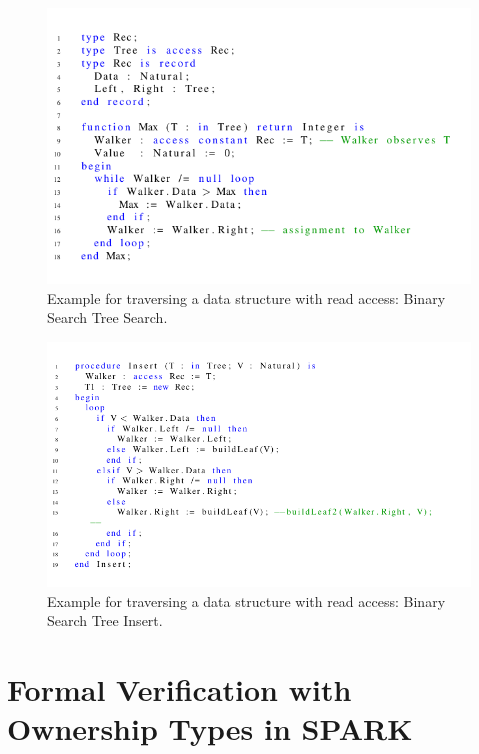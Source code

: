 \documentclass{llncs}
\begin{document}
\begin{figure}[htb!]
\centering
  \captionsetup{justification=centering,margin=0.6cm}
   \includegraphics[width=1\columnwidth]{maxTree}
   \caption{Example for traversing a data structure with read access: Binary Search Tree Search.}
   \label{fig:maxTree}
\end{figure}



\begin{figure}[htb!]
\centering
  \captionsetup{justification=centering,margin=0.6cm}
   \includegraphics[width=1\columnwidth]{treeInsert}
   \caption{Example for traversing a data structure with read access: Binary Search Tree Insert.}
   \label{fig:treeInsert}
\end{figure}

\section{Formal Verification with Ownership Types in SPARK}



\printbibliography[title={References}]
\end{document}
